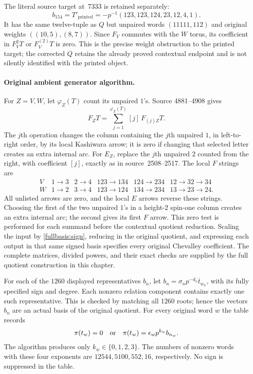 The literal source target at~7333 is retained separately:
\[
 b_{154}=T'_{\mathrm{printed}}
 =-p^{-1}(123,123,124,23,12,4,1).
\]
It has the same twelve-tuple as $Q$ but unpaired words $(11111,112)$
and original weights $((10,5),(8,7))$.  Since $F_V$ commutes with
the $W$ torus, its coefficient in $F_V^2T$ or $F_V^{(2)}T$ is zero.
This is the precise weight obstruction to the printed target; the
corrected $Q$ retains the already proved contextual endpoint and is
not silently identified with the printed object.

\paragraph{Original ambient generator algorithm.}
For $Z=V,W$, let $\varphi_Z(T)$ count its unpaired $1$'s.  Source
4881--4908 gives
\[
 F_ZT=\sum_{j=1}^{\varphi_Z(T)}[j]\,F_{(j)Z}T.
\]
The $j$th operation changes the column containing the $j$th unpaired
$1$, in left-to-right order, by its local Kashiwara arrow; it is zero
if changing that selected letter creates an extra internal arc.  For
$E_Z$, replace the $j$th unpaired $2$ counted from the right, with
coefficient $[j]$, exactly as in source~2508--2517.  The local $F$
strings are
\[
\begin{array}{c|ccccc}
V&1\to3&2\to4&123\to134&124\to234&12\to32\to34\\
W&1\to2&3\to4&123\to124&134\to234&13\to23\to24.
\end{array}
\]
All unlisted arrows are zero, and the local $E$ arrows reverse these
strings.  Choosing the first of the two unpaired $1$'s in a height-$2$
spin-one column creates an extra internal arc; the second gives its
first $F$ arrow.  This zero test is performed for each summand before
the contextual quotient reduction.  Scaling the input by
\eqref{fullbasis:sign}, reducing in the original quotient, and expressing
each output in that same signed basis specifies every original
Chevalley coefficient.  The complete matrices, divided powers, and
their exact checks are supplied by the full quotient construction in
this chapter.


For each of the $1260$ displayed representatives $b_n$, let
$b_n=\sigma_n p^{-d_n}\overline t_{w_n}$, with its fully
specified sign and degree. Each nonzero relation component
contains exactly one such representative. This is checked by
matching all $1260$ roots; hence the vectors $b_n$ are an actual
basis of the original quotient. For every original word $w$
the table records
\begin{equation}\label{eq:full-tab-projection}
 \pi(t_w)=0\quad\hbox{or}\quad
 \pi(t_w)=\epsilon_w p^{k_w}b_{n_w}.
\end{equation}
The algorithm produces only $k_w\in\{0,1,2,3\}$.
The numbers of nonzero words with these four exponents are
$12544,5100,552,16$, respectively. No sign is suppressed in
the table.

